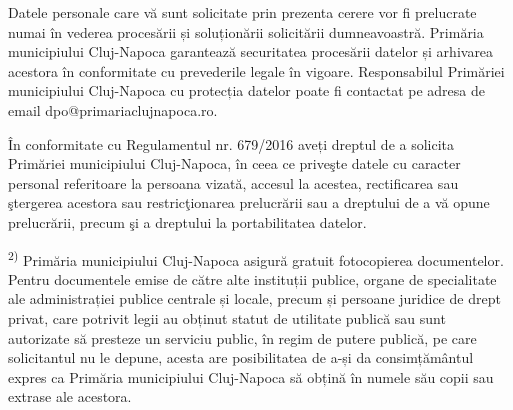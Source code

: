 \documentclass[11pt,a4paper]{article}
\begin{document}
\vspace{0.2cm}

Datele personale care vă sunt solicitate prin prezenta cerere vor fi prelucrate numai în vederea procesării și soluționării solicitării dumneavoastră. Primăria municipiului Cluj-Napoca garantează securitatea procesării datelor și arhivarea acestora în conformitate cu prevederile legale în vigoare. Responsabilul Primăriei municipiului Cluj-Napoca cu protecția datelor poate fi contactat pe adresa de email dpo@primariaclujnapoca.ro.

În conformitate cu Regulamentul nr. 679/2016 aveți dreptul de a solicita Primăriei municipiului Cluj-Napoca, în ceea ce priveşte datele cu caracter personal referitoare la persoana vizată, accesul la acestea, rectificarea sau ştergerea acestora sau restricţionarea prelucrării sau a dreptului de a vă opune prelucrării, precum şi a dreptului la portabilitatea datelor.

\textsuperscript{2)} Primăria municipiului Cluj-Napoca asigură gratuit fotocopierea documentelor. Pentru documentele emise de către alte instituții publice, organe de specialitate ale administrației publice centrale și locale, precum și persoane juridice de drept privat, care potrivit legii au obținut statut de utilitate publică sau sunt autorizate să presteze un serviciu public, în regim de putere publică, pe care solicitantul nu le depune, acesta are posibilitatea de a-și da consimțământul expres ca Primăria municipiului Cluj-Napoca să obțină în numele său copii sau extrase ale acestora.
\end{document}
